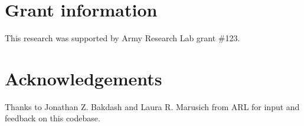 \documentclass[10pt,a4paper]{article}
\begin{document}
\section*{Grant information}
This research was supported by Army Research Lab grant \#123.

\section*{Acknowledgements}
Thanks to Jonathan Z. Bakdash and Laura R. Marusich from ARL for input and
feedback on this codebase.

{\small
}
\end{document}

